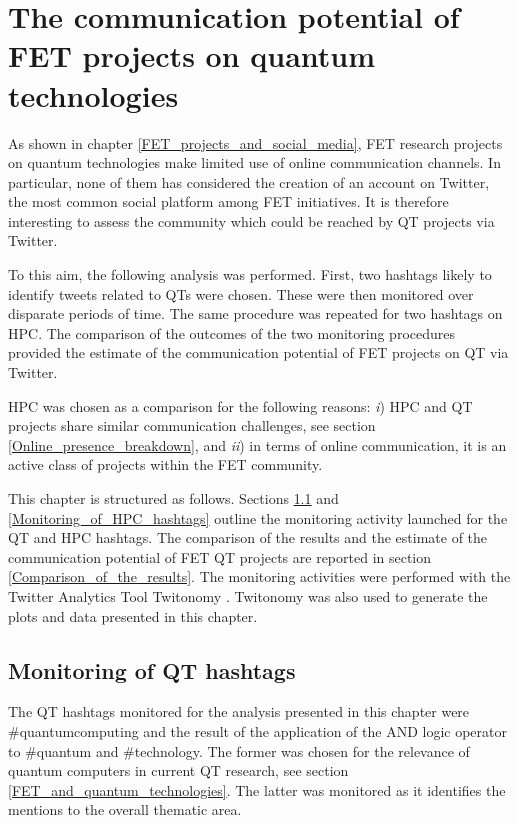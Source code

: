 \chapter{The communication potential of FET projects on quantum technologies}
As shown in chapter \ref{FET_projects_and_social_media}, FET research projects on quantum technologies make limited use of online communication channels. In particular, none of them has considered the creation of an account on Twitter, the most common social platform among FET initiatives. It is therefore interesting to assess the community which could be reached by QT projects via Twitter.

To this aim, the following analysis was performed. First, two hashtags likely to identify tweets related to QTs were chosen. These were then monitored over disparate periods of time. The same procedure was repeated for two hashtags on HPC. The comparison of the outcomes of the two monitoring procedures provided the estimate of the communication potential of FET projects on QT via Twitter.

HPC was chosen as a comparison for the following reasons: \textit{i}) HPC and QT projects share similar communication challenges, see section \ref{Online_presence_breakdown}, and \textit{ii}) in terms of online communication, it is an active class of projects within the FET community.

This chapter is structured as follows. Sections \ref{Monitoring_of_QT_hashtags} and \ref{Monitoring_of_HPC_hashtags} outline the monitoring activity launched for the QT and HPC hashtags. The comparison of the results and the estimate of the communication potential of FET QT projects are reported in section \ref{Comparison_of_the_results}. The monitoring activities were performed with the Twitter Analytics Tool Twitonomy \cite{Twitonomy}. Twitonomy was also used to generate the plots and data presented in this chapter.

\section{Monitoring of QT hashtags} \label{Monitoring_of_QT_hashtags}
The QT hashtags monitored for the analysis presented in this chapter were \#quantumcomputing and the result of the application of the AND logic operator to \#quantum and \#technology. The former was chosen for the relevance of quantum computers in current QT research, see section \ref{FET_and_quantum_technologies}. The latter was monitored as it identifies the mentions to the overall thematic area. 

